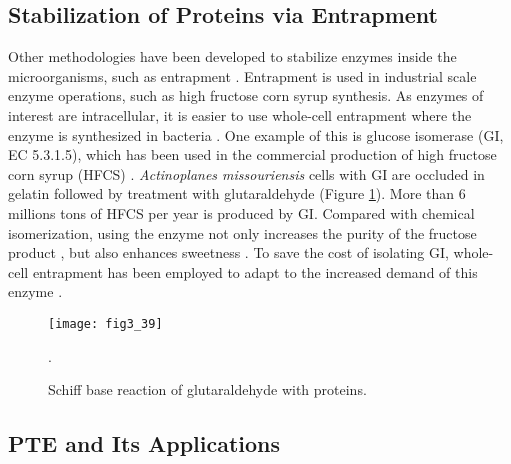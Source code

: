 \begin{refsection}
\subsection{Stabilization of Proteins via Entrapment}

Other methodologies have been developed to stabilize enzymes inside the
microorganisms, such as entrapment
\cite{Trelles2013,Bhosale1996,Etzel1996,Suekane1982}. Entrapment is used in
industrial scale enzyme operations, such as high fructose corn syrup synthesis.
As enzymes of interest are intracellular, it is easier to use whole-cell
entrapment where the enzyme is synthesized in bacteria \cite{Suekane1982}. One
example of this is glucose isomerase (GI, EC 5.3.1.5), which has been used in
the commercial production of high fructose corn syrup (HFCS)
\cite{Bhosale1996}. \emph{Actinoplanes missouriensis} cells with GI are
occluded in gelatin followed by treatment with glutaraldehyde \cite{Cfibwjps}
(Figure \ref{fig:enzyme-entrapment}).  More than 6 millions tons of HFCS per
year is produced by GI.  Compared with chemical isomerization, using the enzyme
not only increases the purity of the fructose product \cite{Barker1975}, but
also enhances sweetness \cite{Bhosale1996}. To save the cost of isolating GI,
whole-cell entrapment has been employed to adapt to the increased demand of
this enzyme \cite{Suekane1982}.  
\begin{figure}[htbp] \centering \texttt{[image: fig3\_39]}
    \caption[Schiff base reaction of glutaraldehyde with proteins.]{Schiff base
        reaction of glutaraldehyde with proteins. \cite{Cfibwjps}}.
        \label{fig:enzyme-entrapment} 
\end{figure}

\subsection{PTE and Its Applications}


\end{refsection}
